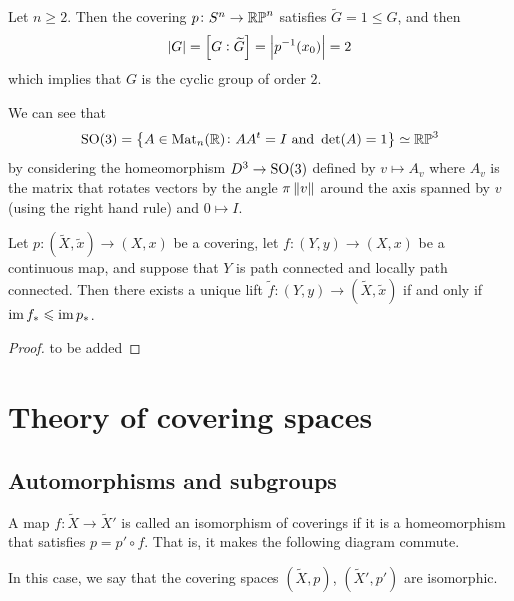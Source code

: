\documentclass[11pt,a4paper]{article}
\begin{document}
\begin{example}
  
\end{example}

\begin{example}
  Let $n \geq 2$.
  Then the covering $p \colon S^n \to \mathbb{RP}^n$ satisfies
  $\widetilde G = 1 \leqslant G$, and then
  \[
    |G| = \left[G:\widetilde G\right] = \left\lvert p^{-1}(x_0)\right\rvert = 2
  \]
  which implies that $G$ is the cyclic group of order $2$.
\end{example}

\begin{example}
  We can see that
  \[
    \mathrm{SO}(3) =
    \left\{A \in \operatorname{Mat}_n(\mathbb{R}) \colon A A^t = I \text{ and } \det(A) = 1\right\} \simeq
    \mathbb{RP}^3
  \]
  by considering the homeomorphism $D^3 \to \mathrm{SO}(3)$ defined by
  $v \mapsto A_v$ where $A_v$ is the matrix that rotates vectors
  by the angle $\pi \left\lVert v\right\rVert$ around the axis spanned by $v$ (using
  the right hand rule) and $0 \mapsto I$.
\end{example}

\begin{theorem}
  Let $p \colon (\widetilde X, \tilde x) \to (X, x)$ be a covering,
  let $f \colon (Y,y) \to (X,x)$ be a continuous map,
  and suppose that $Y$ is path connected and locally path connected.
  Then there exists a unique lift
  $\tilde f \colon (Y,y) \to (\widetilde X, \tilde x)$ if and only if
  $\operatorname{im} f_* \leqslant \operatorname{im} p_*$.
\end{theorem}
\begin{proof}
  to be added
\end{proof}

\newpage

\section{Theory of covering spaces}
\subsection{Automorphisms and subgroups}
\begin{definition}
  A map $f \colon \widetilde X \to \widetilde X'$ is called an isomorphism of
  coverings if it is a homeomorphism that satisfies $p = p' \circ f$.
  That is, it makes the following diagram commute.
  \begin{center}
  \end{center}
  In this case, we say that the covering spaces $(\widetilde X, p)$,
  $(\widetilde X', p')$ are isomorphic.
\end{definition}
\end{document}
